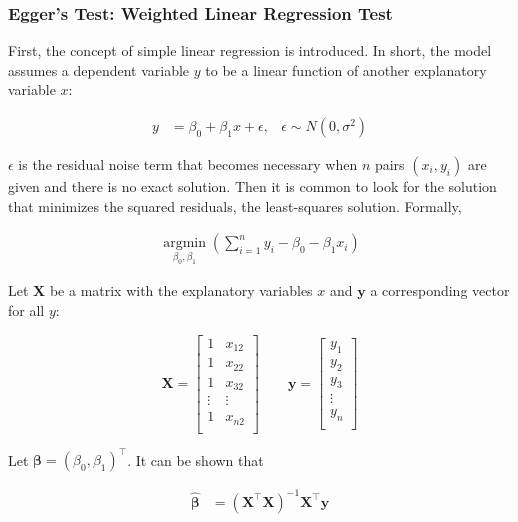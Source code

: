 \documentclass[11pt,a4paper,twoside]{book}\usepackage[]{graphicx}\usepackage[]{color}
\begin{document}
\subsubsection{Egger's Test: Weighted Linear Regression Test} \label{sec:Egger}
First, the concept of simple linear regression is introduced. In short, the model assumes a dependent variable $y$ to be a linear function of another explanatory variable $x$:

\begin{align}
y &= \beta_0 + \beta_1 x + \epsilon, & \epsilon \sim N(0, \sigma^2) \label{eq:simple.regression}
\end{align}

$\epsilon$ is the residual noise term that becomes necessary when $n$ pairs $(x_i, y_i)$ are given and there is no exact solution. Then it is common to look for the solution that minimizes the squared residuals, the least-squares solution. Formally,

\begin{align}
\operatorname*{argmin}_{\beta_0, \beta_1}(\sum_{i = 1}^n y_i - \beta_0 - \beta_1 x_i) \label{eq:least.squares}
\end{align}

Let $\mathbf{X}$ be a matrix with the explanatory variables $x$ and $\mathbf{y}$ a corresponding vector for all $y$:

\begin{equation*}
\mathbf{X} = 
\begin{bmatrix}
1 & x_{12} \\
1 & x_{22} \\
1 & x_{32} \\
\vdots & \vdots \\
1 & x_{n2} \\
\end{bmatrix} 
\qquad
\mathbf{y} = 
\begin{bmatrix}
y_1 \\
y_2 \\
y_3 \\
\vdots \\
y_n \\
\end{bmatrix}
\end{equation*}

Let $\mathbf{\beta} = (\beta_0, \beta_1)^\top$. It can be shown that 

\begin{align}
\hat{\mathbf{\beta}} &= (\mathbf{X}^\top \mathbf{X})^{-1} \mathbf{X}^\top \mathbf{y} \label{eq:regression.parameters}
\end{align}
\end{document}
